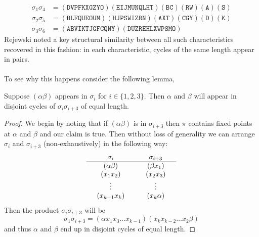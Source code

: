 \begin{align*}
	\sigma_1\sigma_4 & = (\texttt{DVPFKXGZYO})(\texttt{EIJMUNQLHT})(\texttt{BC})(\texttt{RW})(\texttt{A})(\texttt{S}) \\
	\sigma_2\sigma_5 & = (\texttt{BLFQUEOUM})(\texttt{HJPSWIZRN})(\texttt{AXT})(\texttt{CGY})(\texttt{D})(\texttt{K}) \\
	\sigma_3\sigma_6 & = (\texttt{ABVIKTJGFCQNY})(\texttt{DUZREHLXWPSMO})
\end{align*}
Rejewski noted a key structural similarity between all such characteristics recovered in this fashion: in each characteristic, cycles of the same length appear in pairs.
\\\\To see why this happens consider the following lemma,
\begin{lemma}
	Suppose $(\alpha\beta)$ appears in $\sigma_i$ for $i\in\{1,2,3\}$. Then $\alpha$ and $\beta$ will appear in disjoint cycles of $\sigma_i\sigma_{i+3}$ of equal length.
\end{lemma}
\begin{proof}
	We begin by noting that if $(\alpha\beta)$ is in $\sigma_{i+3}$ then $\pi$ contains fixed points at $\alpha$ and $\beta$ and our claim is true. Then without loss of generality we can arrange $\sigma_{i}$ and $\sigma_{i+3}$ (non-exhaustively) in the following way:
	\[
		\setlength{\arraycolsep}{15pt}
		\begin{array}{cc}
			\sigma_i      & \sigma_{i+3} \\
			\hline
			(\alpha\beta) & (\beta x_1)  \\
			(x_1 x_2)     & (x_2 x_3)    \\
			\vdots        & \vdots       \\
			(x_{k-1} x_k) & (x_k \alpha)
		\end{array}
	\]
	Then the product $\sigma_i\sigma_{i+3}$ will be
	\[
		\sigma_1\sigma_{i+3} = (\alpha x_1 x_3 \dots x_{k-1} )(x_k x_{k-2} \dots x_2 \beta)
	\]
	and thus $\alpha$ and $\beta$ end up in disjoint cycles of equal length.
\end{proof}

